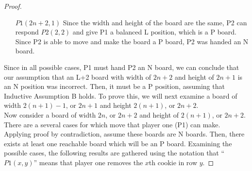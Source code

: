 \documentclass{amsart}
\theoremstyle{definition}
\theoremstyle{remark}
\numberwithin{equation}{section}
\begin{document}
\begin{proof}
\begin{itemize}
	\item [$P1(2n+2, 1)$] Since the width and height of the board are the same, P2 can respond $P2(2, 2)$ and give P1 a balanced L position, which is a P board.  Since P2 is able to move and make the board a P board, P2 was handed an N board.
\end{itemize}
	Since in all possible cases, P1 must hand P2 an N board, we can conclude that our assumption that an L+2 board with width of $2n+2$ and height of $2n+1$ is an N position was incorrect.  Then, it must be a P position, assuming that Inductive Assumption B holds.  To prove this, we will next examine a board of width $2(n+1)-1$, or $2n+1$ and height $2(n+1)$, or $2n+2$.\\

Now consider a board of width $2n$, or $2n+2$ and height of $2(n+1)$, or $2n + 2$.  There are a several cases for which move that player one (P1) can make.  Applying proof by contradiction, assume these boards are N boards.  Then, there exists at least one reachable board which will be an P board.  Examining the possible cases, the following results are gathered using the  notation that ``$P1(x,y)$'' means that player one removes the $x$th cookie in row $y$.


\end{proof}
\end{document}

